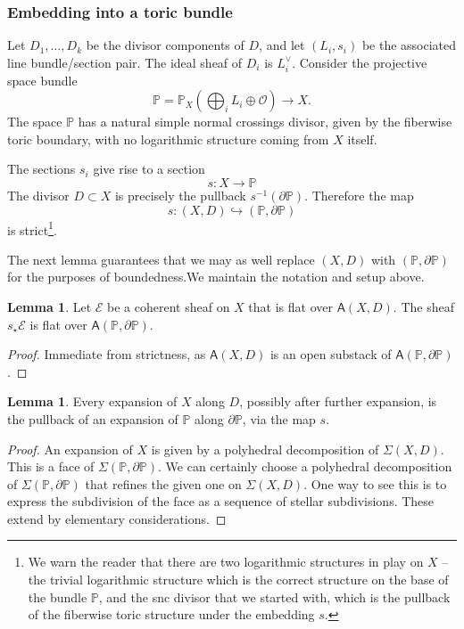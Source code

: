 \documentclass[11pt]{amsart}
\theoremstyle{definition}
\theoremstyle{definition}
\newtheorem{lemma}[theorem]{Lemma}
\begin{document}
\subsubsection{Embedding into a toric bundle} Let $D_1,\ldots, D_k$ be the divisor components of $D$, and let $(L_i,s_i)$ be the associated line bundle/section pair. The ideal sheaf of $D_i$ is $L_i ^\vee$. Consider the projective space bundle
\[
\mathbb P = \mathbb P_X\left(\bigoplus_i L_i\oplus \mathcal O\right)\to X.
\]
The space $\mathbb P$ has a natural simple normal crossings divisor, given by the fiberwise toric boundary, with no logarithmic structure coming from $X$ itself. 

The sections $s_i$ give rise to a section
\[
s\colon X\to \mathbb P
\]
The divisor $D\subset X$ is precisely the pullback $s^{-1}(\partial \mathbb P)$. Therefore the map
\[
s\colon (X,D)\hookrightarrow (\mathbb P,\partial \mathbb P)
\]
is strict\footnote{We warn the reader that there are two logarithmic structures in play on $X$ -- the trivial logarithmic structure which is the correct structure on the base of the bundle $\mathbb P$, and the snc divisor that we started with, which is the pullback of the fiberwise toric structure under the embedding $s$.}. 

The next lemma guarantees that we may as well replace $(X,D)$ with $(\mathbb P,\partial \mathbb P)$ for the purposes of boundedness.We maintain the notation and setup above. 

\begin{lemma}
Let $\mathcal E$ be a coherent sheaf on $X$ that is flat over $\mathsf A(X,D)$. The sheaf $s_\star\mathcal E$ is flat over $\mathsf A(\mathbb P,\partial \mathbb P)$. 
\end{lemma}

\begin{proof}
Immediate from strictness, as $\mathsf A(X,D)$ is an open substack of $\mathsf A(\mathbb P,\partial \mathbb P)$. 
\end{proof}

\begin{lemma}\label{lem:CanPullBack}
Every expansion of $X$ along $D$, possibly after further expansion, is the pullback of an expansion of $\mathbb P$ along $\partial \mathbb P$, via the map $s$. 
\end{lemma}

\begin{proof}
An expansion of $X$ is given by a polyhedral decomposition of $\Sigma(X,D)$. This is a face of $\Sigma(\mathbb P,\partial \mathbb P)$. We can certainly choose a polyhedral decomposition of $\Sigma(\mathbb P,\partial \mathbb P)$ that refines the given one on $\Sigma(X,D)$. One way to see this is to express the subdivision of the face as a sequence of stellar subdivisions. These extend by elementary considerations. 
\end{proof}
\end{document}
